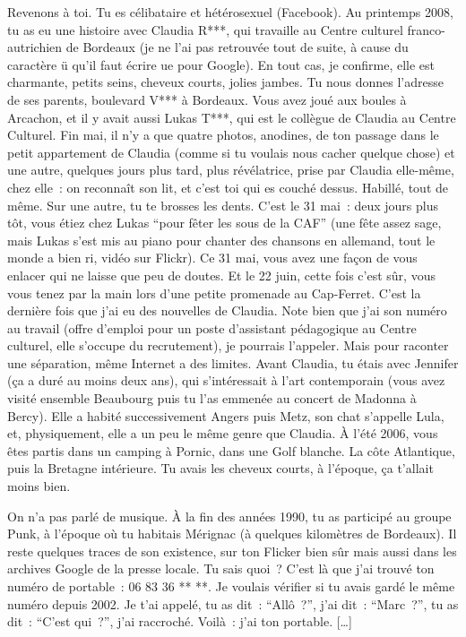 Revenons à toi. Tu es célibataire et hétérosexuel (Facebook). Au printemps 2008, tu as eu une histoire avec Claudia R***, qui travaille au Centre culturel franco-autrichien de Bordeaux (je ne l'ai pas retrouvée tout de suite, à cause du caractère ü qu'il faut écrire ue pour Google). En tout cas, je confirme, elle est charmante, petits seins, cheveux courts, jolies jambes. Tu nous donnes l'adresse de ses parents, boulevard V*** à Bordeaux. Vous avez joué aux boules à Arcachon, et il y avait aussi Lukas T***, qui est le collègue de Claudia au Centre Culturel. Fin mai, il n'y a que quatre photos, anodines, de ton passage dans le petit appartement de Claudia (comme si tu voulais nous cacher quelque chose) et une autre, quelques jours plus tard, plus révélatrice, prise par Claudia elle-même, chez elle : on reconnaît son lit, et c'est toi qui es couché dessus. Habillé, tout de même. Sur une autre, tu te brosses les dents. C'est le 31 mai : deux jours plus tôt, vous étiez chez Lukas \enquote{pour fêter les sous de la CAF} (une fête assez sage, mais Lukas s'est mis au piano pour chanter des chansons en allemand, tout le monde a bien ri, vidéo sur Flickr). Ce 31 mai, vous avez une façon de vous enlacer qui ne laisse que peu de doutes. Et le 22 juin, cette fois c'est sûr, vous vous tenez par la main lors d'une petite promenade au Cap-Ferret. C'est la dernière fois que j'ai eu des nouvelles de Claudia. Note bien que j'ai son numéro au travail (offre d'emploi pour un poste d'assistant pédagogique au Centre culturel, elle s'occupe du recrutement), je pourrais l'appeler. Mais pour raconter une séparation, même Internet a des limites. Avant Claudia, tu étais avec Jennifer (ça a duré au moins deux ans), qui s'intéressait à l'art contemporain (vous avez visité ensemble Beaubourg puis tu l'as emmenée au concert de Madonna à Bercy). Elle a habité successivement Angers puis Metz, son chat s'appelle Lula, et, physiquement, elle a un peu le même genre que Claudia. À l'été 2006, vous êtes partis dans un camping à Pornic, dans une Golf blanche. La côte Atlantique, puis la Bretagne intérieure. Tu avais les cheveux courts, à l'époque, ça t'allait moins bien.

On n'a pas parlé de musique. À la fin des années 1990, tu as participé au groupe Punk, à l'époque où tu habitais Mérignac (à quelques kilomètres de Bordeaux). Il reste quelques traces de son existence, sur ton Flicker bien sûr mais aussi dans les archives Google de la presse locale. Tu sais quoi ? C'est là que j'ai trouvé ton numéro de portable : 06 83 36 ** **. Je voulais vérifier si tu avais gardé le même numéro depuis 2002. Je t'ai appelé, tu as dit : \enquote{Allô ?}, j'ai dit : \enquote{Marc ?}, tu as dit : \enquote{C'est qui ?}, j'ai raccroché. Voilà : j'ai ton portable. […]

